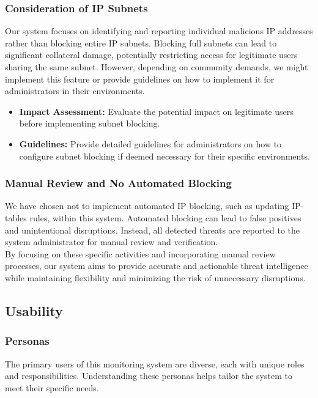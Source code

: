 \documentclass{article}
\begin{document}
    \subsubsection{Consideration of IP Subnets}\label{subsubsec:ip-subnets}

    Our system focuses on identifying and reporting individual malicious IP addresses rather than blocking entire IP subnets.
    Blocking full subnets can lead to significant collateral damage, potentially restricting access for legitimate users sharing the same subnet.
    However, depending on community demands, we might implement this feature or provide guidelines on how to implement it for administrators in their environments.

    \begin{itemize}
        \item \textbf{Impact Assessment:} Evaluate the potential impact on legitimate users before implementing subnet blocking.
        \item \textbf{Guidelines:} Provide detailed guidelines for administrators on how to configure subnet blocking if deemed necessary for their specific environments.
    \end{itemize}

    \subsubsection{Manual Review and No Automated Blocking}\label{subsubsec:manual-review}
    We have chosen not to implement automated IP blocking, such as updating IP-tables rules, within this system.
    Automated blocking can lead to false positives and unintentional disruptions.
    Instead, all detected threats are reported to the system administrator for manual review and verification.\\

    \noindent By focusing on these specific activities and incorporating manual review processes, our system aims to provide accurate and actionable threat intelligence while maintaining flexibility and minimizing the risk of unnecessary disruptions.

    \subsection{Usability}\label{subsec:usability}

    \subsubsection{Personas}\label{subsubsec:personas}
    The primary users of this monitoring system are diverse, each with unique roles and responsibilities.
    Understanding these personas helps tailor the system to meet their specific needs.
\end{document}
